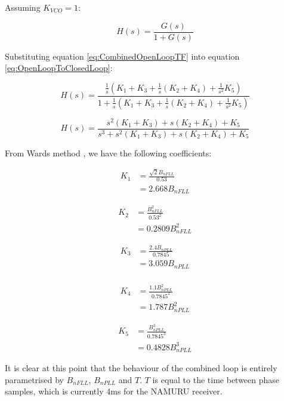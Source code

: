 Assuming $K_{VCO}=1$:

\begin{equation}
 H(s) = \frac{G(s)}{1+G(s)}
\label{eq:OpenLoopToClosedLoop}
\end{equation}

Substituting equation \ref{eq:CombinedOpenLoopTF} into equation \ref{eq:OpenLoopToClosedLoop}:

\begin{equation}
 H(s) = \frac{\frac{1}{s} (K_1+K_3 + \frac{1}{s}(K_2+K_4) + \frac{1}{s^2} K_5)}{1+\frac{1}{s} (K_1+K_3 + \frac{1}{s}(K_2+K_4) + \frac{1}{s^2} K_5)}
\end{equation}

\begin{equation}
 H(s) = \frac{s^2(K_1+K_3) + s(K_2+K_4) + K_5}
 {s^3+ s^2(K_1+K_3)+ s(K_2+K_4) + K_5}
\end{equation}
\clearpage


From Wards method \cite{Ward}, we have the following coefficients:

\begin{align*}
K_1 &=\frac{\sqrt{2}B_{nFLL}}{0.53}\\
    &= 2.668 B_{nFLL}
\end{align*}

\begin{align*}
K_2 &=\frac{B_{nFLL}^2}{0.53^2}\\
    &= 0.2809 B_{nFLL}^2
\end{align*}

\begin{align*}
K_3 &=\frac{2.4B_{nPLL}}{0.7845}\\ 
    &=3.059 B_{nPLL}\\
\end{align*}

\begin{align*}
K_4 &=\frac{1.1B_{nPLL}^2}{0.7845^2}\\
    &=1.787 B_{nPLL}^2
\end{align*}

\begin{align*}
K_5 &=\frac{B_{nPLL}^3}{0.7845^3}\\
    &=0.4828B_{nPLL}^3
\end{align*}

It is clear at this point that the behaviour of the combined loop is entirely parametrised by $B_{nFLL}$,  $B_{nPLL}$ and $T$. $T$ is equal to the time between phase samples, which is currently 4ms for the \ac{NAMURU} receiver.


